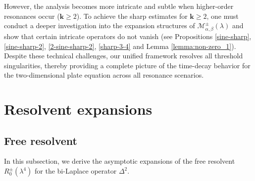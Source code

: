 \documentclass[reqno]{amsart}
\numberwithin{equation}{section}
\begin{document}
However, the analysis becomes more intricate and subtle when higher-order resonances occur ($\mathbf{k} \ge 2$).   To achieve the sharp   estimates for $\mathbf{k} \ge 2$,  one must conduct a  deeper investigation into the expansion structures of $\mathcal{M}_{\alpha,\beta}^{\pm}(\lambda)$ and  show that certain intricate  operators do not  vanish (see Propositions \ref{sine-sharp}, \ref{sine-sharp-2}, \ref{2-sine-sharp-2}, \ref{sharp-3-4} and Lemma \ref{lemma:non-zero_1}). Despite these  technical challenges, our unified framework  resolves all threshold singularities, thereby providing a complete picture of the time-decay behavior for the two-dimensional plate equation across all resonance scenarios.

\section{Resolvent expansions}\label{sec:reso-expan}
\subsection{Free resolvent  }\label{subsec:free_resolvent}
In this subsection, we derive the asymptotic expansions of the free resolvent $R_0^\pm(\lambda^4)$ for the bi-Laplace operator $\Delta^2$.
\end{document}
